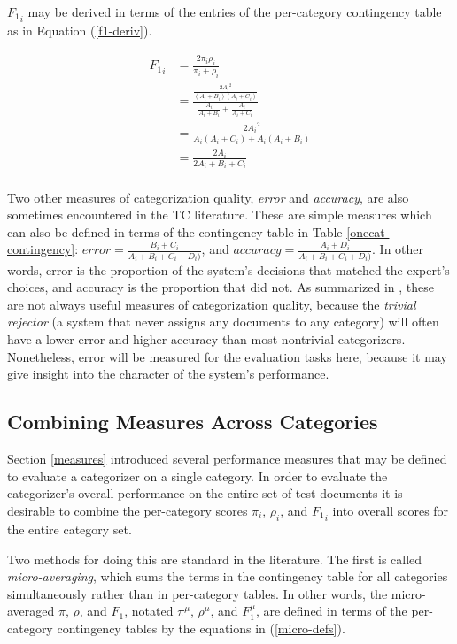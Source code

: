 ${F_1}_i$ may be derived in terms of the entries of the per-category
contingency table as in Equation (\ref{f1-deriv}).

\begin{equation} \label{f1-deriv}
\begin{split}
{F_1}_i 
 & = \frac{ 2 \pi_i \rho_i}{\pi_i + \rho_i} \\[6pt]
 & = \frac{ \frac{2 {A_i}^2}{(A_i+B_i)(A_i+C_i)} } { \frac{A_i}{A_i+B_i} + \frac{A_i}{A_i+C_i} } \\[6pt]
 & = \frac{ 2 {A_i}^2 }                            { A_i(A_i+C_i) + A_i(A_i+B_i) } \\[6pt]
 & = \frac{ 2 A_i }                                { 2 A_i + B_i + C_i } \\[6pt]
\end{split}
\end{equation}

Two other measures of categorization quality, \emph{error} and
\emph{accuracy}, are also sometimes encountered in the TC literature.
These are simple measures which can also be defined in terms of the
contingency table in Table \ref{onecat-contingency}: $error =
\frac{B_i+C_i}{A_i+B_i+C_i+D_i)}$, and $accuracy =
\frac{A_i+D_i}{A_i+B_i+C_i+D_i)}$.  In other words, error is the
proportion of the system's decisions that matched the expert's
choices, and accuracy is the proportion that did not.  As summarized
in \cite[p. 34]{sebastiani:02}, these are not always useful measures
of categorization quality, because the \emph{trivial rejector} (a
system that never assigns any documents to any category) will often
have a lower error and higher accuracy than most nontrivial
categorizers.  Nonetheless, error will be measured for the evaluation
tasks here, because it may give insight into the character of the
system's performance.


\subsection{Combining Measures Across Categories}
\label{combining-measures}

Section \ref{measures} introduced several performance measures that
may be defined to evaluate a categorizer on a single category.  In
order to evaluate the categorizer's overall performance on the entire
set of test documents it is desirable to combine the per-category
scores $\pi_i$, $\rho_i$, and ${F_1}_i$ into overall scores for the
entire category set.

Two methods for doing this are standard in the literature.  The first
is called \emph{micro-averaging}, which sums the terms in the
contingency table for all categories simultaneously rather than in
per-category tables.  In other words, the micro-averaged $\pi$,
$\rho$, and $F_1$, notated $\pi^\mu$, $\rho^\mu$, and $F^\mu_1$, are
defined in terms of the per-category contingency tables by the
equations in (\ref{micro-defs}).

